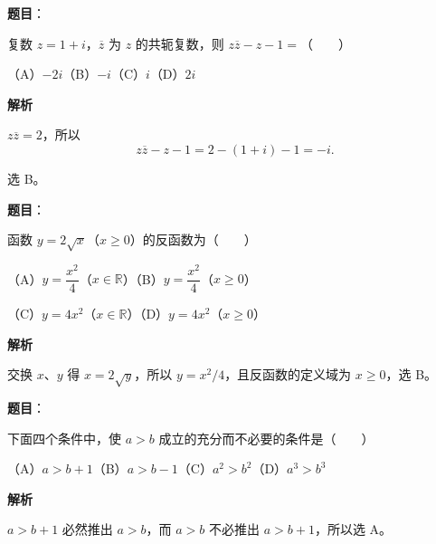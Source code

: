 

\begin{answer}

\textbf{题目}：

复数 $z=1+i$，$\overline z$ 为 $z$ 的共轭复数，则 $z\overline z-z-1=$\mbox{（　　）}

（A）$-2i$\quad（B）$-i$\quad（C）$i$\quad（D）$2i$

\textbf{解析}

$z\overline z=2$，所以
\nopagebreak[4]
\[
z\overline z-z-1=2-(1+i)-1=-i.
\]

选 B。


\end{answer}
\begin{answer}

\textbf{题目}：

函数 $y=2\sqrt{x}$（$x\geq0$）的反函数为\mbox{（　　）}

（A）$y=\dfrac{x^2}{4}$（$x\in\mathbb R$）\quad（B）$y=\dfrac{x^2}{4}$（$x\geq0$）

（C）$y=4x^2$（$x\in\mathbb R$）\quad（D）$y=4x^2$（$x\geq0$）

\textbf{解析}

交换 $x\text{、}y$ 得 $x=2\sqrt y$，所以
$y=x^2/4$，且反函数的定义域为 $x\geq0$，选 B。


\end{answer}
\begin{answer}

\textbf{题目}：

下面四个条件中，使 $a>b$ 成立的充分而不必要的条件是\mbox{（　　）}

（A）$a>b+1$\quad（B）$a>b-1$\quad（C）$a^2>b^2$\quad（D）$a^3>b^3$

\textbf{解析}

$a>b+1$ 必然推出 $a>b$，而 $a>b$ 不必推出
$a>b+1$，所以选 A。


\end{answer}

